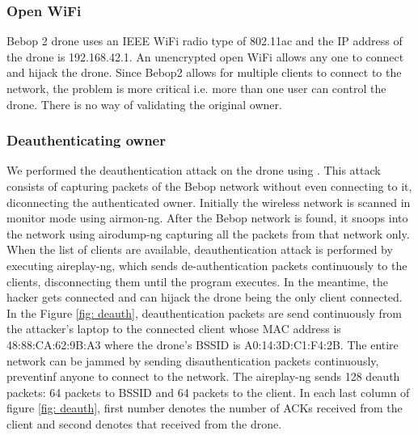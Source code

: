 \documentclass[conference]{IEEEtran}
\begin{document}
\subsubsection{Open WiFi}
Bebop 2 drone uses
an IEEE WiFi radio type of 802.11ac and the IP address of the drone is 192.168.42.1. 
An unencrypted open WiFi allows any one to connect and hijack the drone. Since Bebop2 allows for multiple clients to connect to the network, the problem is more critical i.e. more than one user can control the drone. There is no way of validating the original owner. 
\subsubsection{Deauthenticating owner}
We performed the deauthentication attack on the drone using \cite{aircrack}. This attack consists of capturing packets of the Bebop network without even connecting to it, diconnecting the authenticated owner. Initially the wireless network is scanned in monitor mode using airmon-ng. After the Bebop network is found, it snoops into the network using airodump-ng capturing all the packets from that network only. 
When the list of clients are available, deauthentication attack is performed by executing aireplay-ng, which sends de-authentication packets continuously to the clients, disconnecting them until the program executes. In the meantime, the hacker gets connected and can hijack the drone being the only client connected.
\\
In the Figure \ref{fig: deauth}, deauthentication packets are send continuously from the attacker's laptop to the connected client whose MAC address is 48:88:CA:62:9B:A3 where the drone's BSSID is A0:14:3D:C1:F4:2B. The entire network can be jammed by sending disauthentication packets continuously, preventinf anyone to connect to the network. The aireplay-ng sends 128 deauth packets: 64 packets to BSSID and 64 packets to the client. In each last column of figure \ref{fig: deauth}, first number denotes the number of ACKs received from the client and second denotes that received from the drone.
\end{document}
